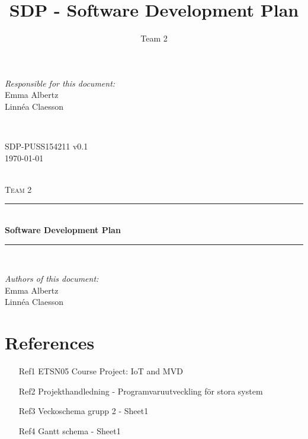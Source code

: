 \documentclass[a4paper]{article}
\title{SDP - Software Development Plan}
\author{Team 2}
\begin{document}
\begin{titlepage}
\newcommand{\HRule}{\rule{\linewidth}{0.5mm}}

\begin{minipage}{0.5\textwidth}
\begin{flushleft} %
\textit{Responsible for this document:}\\
Emma Albertz \\
Linnéa Claesson
\end{flushleft}
\end{minipage}
~
\begin{minipage}{0.4\textwidth}
\begin{flushright}
SDP-PUSS154211 v0.1 \\
\today
\end{flushright}
\end{minipage}\\[3cm]

\centering
\textsc{\LARGE Team 2}\\[0.5cm]

\HRule \\[0.4cm]
{ \huge \bfseries Software Development Plan}\\[0.4cm] %
\HRule \\[1.5cm]

\vfill
\begin{flushleft}
\textit{Authors of this document:}\\
Emma Albertz \\
Linnéa Claesson
\end{flushleft}



\end{titlepage}
\setcounter{tocdepth}{2}
\tableofcontents
\newpage
{}

\section{References}
\begin{itemize}
\item[Ref1] ETSN05 Course Project: IoT and MVD
\item[Ref2] Projekthandledning - Programvaruutveckling för stora system
\item[Ref3] Veckoschema grupp 2 - Sheet1
\item[Ref4] Gantt schema - Sheet1
\end{itemize}
\end{document}

